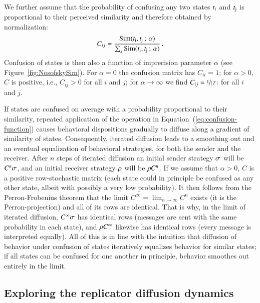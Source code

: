 \documentclass[fleqn,reqno,10pt]{article}
\newcommand{\impairment}{\ensuremath{\alpha}} %
\newcommand{\similarity}{\ensuremath{\mathrm{Sim}}} %
\begin{document}
We further assume that the probability of confusing any two states
$t_{\mathrm{i}}$ and $t_{\mathrm{j}}$ is proportional to their perceived
similarity and therefore obtained by normalization:
\begin{align*}
  C_{ij} = \frac{\similarity(\mystate{i}, \mystate{j} \myts ; \myts
  \impairment)} {\sum_j \similarity(\mystate{i}, \mystate{j} \myts ; \myts
  \impairment)} \,.
\end{align*}
Confusion of states is then also a function of imprecision parameter
$\impairment$ (see Figure~\ref{fig:NosofskySim}). For $\impairment =
0$ the confusion matrix has $C_{ii} = 1$; for $\impairment > 0$, $C$
is positive, i.e., $C_{ij} >0$ for all $i$ and $j$; for $\impairment
\rightarrow \infty$ we find $C_{ij} = \nicefrac{1}{\left \lvert \, T \, \right\rvert}$
for all $i$ and $j$.

If states are confused on average with a probability proportional to
their similarity, repeated application of the operation in
Equation~(\ref{eq:confusion-function}) causes behavioral dispositions
gradually to diffuse along a gradient of similarity of
states. Consequently, iterated diffusion leads to a smoothing out and
an eventual equalization of behavioral strategies, for both the sender
and the receiver. After $n$ steps of iterated diffusion an initial
sender strategy $\sigma$ will be $C^n \sigma$, and an initial
receiver strategy $\rho$ will be $\rho C^n$. If we assume that
$\impairment > 0$, $C$ is a positive row-stochastic matrix (each state
could in principle be confused as any other state, albeit with
possibly a very low probability). It then follows from the
Perron-Frobenius theorem that the limit $C^\infty = \lim_{n
  \rightarrow \infty} C^n$ exists (it is the Perron-projection) and
all of its rows are identical. That is why, in the limit of iterated
diffusion, $C^\infty \sigma$ has identical rows (messages are sent
with the same probability in each state), and $\rho C^\infty$
likewise has identical rows (every message is interpreted
equally). All of this is in line with the intuition that diffusion of
behavior under confusion of states iteratively equalizes behavior for
similar states; if all states can be confused for one another in
principle, behavior smoothes out entirely in the limit.

\subsection{Exploring the replicator diffusion dynamics}
\label{sec:simulations}
\end{document}
